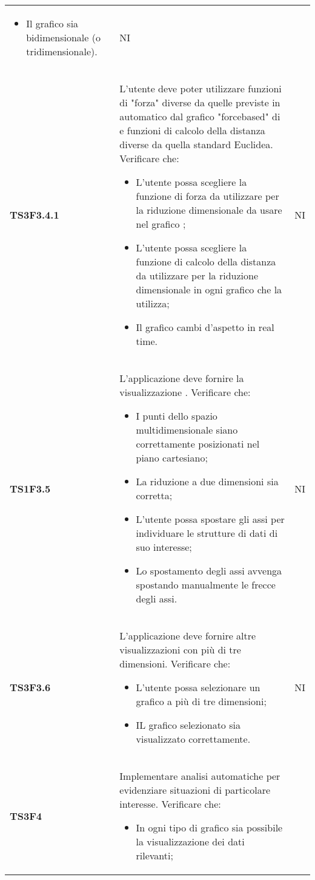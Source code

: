 \begin{longtable}{C{2.5cm} C{12cm} C{2cm}}
\begin{itemize}
						\item Il grafico sia bidimensionale (o tridimensionale).
					\end{itemize}	
				 & NI \\
\textbf{TS3F3.4.1} & L'utente deve poter utilizzare funzioni di "forza" diverse da quelle previste in automatico dal grafico "forcebased" di  e funzioni di calcolo della distanza diverse da quella standard Euclidea. Verificare che:
					\begin{itemize}
						\item L'utente possa scegliere la funzione di forza da utilizzare per la riduzione dimensionale da usare nel grafico ;
						\item L'utente possa scegliere la funzione di calcolo della distanza da utilizzare per la riduzione dimensionale in ogni grafico che la utilizza;
						\item Il grafico cambi d'aspetto in real time.
					\end{itemize}
				   & NI \\
\textbf{TS1F3.5} & L'applicazione deve fornire la visualizzazione . Verificare che:
					\begin{itemize}
						\item I punti dello spazio multidimensionale siano correttamente posizionati nel piano cartesiano;
						\item La riduzione a due dimensioni sia corretta;
						\item L'utente possa spostare gli assi per individuare le strutture di dati di suo interesse;
						\item Lo spostamento degli assi avvenga spostando manualmente le frecce degli assi.
					\end{itemize}	
				   & NI \\
\textbf{TS3F3.6} & L'applicazione deve fornire altre visualizzazioni con più di tre dimensioni. Verificare che:
					\begin{itemize}
						\item L'utente possa selezionare un grafico a più di tre dimensioni;
						\item IL grafico selezionato sia visualizzato correttamente.
					\end{itemize}	
				   & NI \\
\textbf{TS3F4} & Implementare analisi automatiche per evidenziare situazioni di particolare interesse. Verificare che: 
					\begin{itemize}
						\item In ogni tipo di grafico sia possibile la visualizzazione dei dati rilevanti;

\end{itemize}
\end{longtable}
